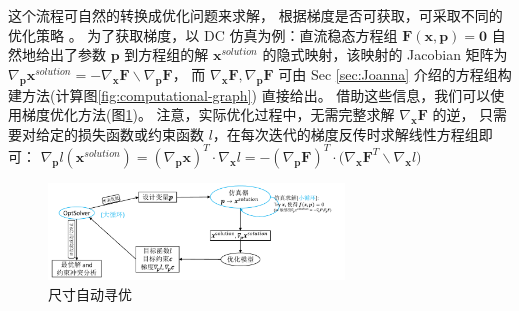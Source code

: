 这个流程可自然的转换成优化问题来求解，
根据梯度是否可获取，可采取不同的优化策略
\cite{zhan2004optimization,agrawal2006circuit,huang2013efficient,
nieuwoudt2005multi,peng2016efficient,girardi2011analog,lyu2018batch,
wang2014enabling,lyu2017efficient,tang2018parametric}。
为了获取梯度，以 DC 仿真为例：直流稳态方程组
$\bm{F}(\bm{x},\bm{p})=\bm{0}$ 自然地给出了参数 $\bm{p}$
到方程组的解 $\bm{x}^{solution}$ 的隐式映射，该映射的 Jacobian 矩阵为
$\nabla_{\bm{p}}\bm{x}^{solution}=-\nabla_{\bm{x}}\bm{F}\backslash\nabla_{\bm{p}}\bm{F}$，
而 $\nabla_{\bm{x}}\bm{F},\nabla_{\bm{p}}\bm{F}$ 可由 Sec \ref{sec:Joanna}
介绍的方程组构建方法(计算图\ref{fig:computational-graph}) 直接给出。
借助这些信息，我们可以使用梯度优化方法(图\ref{fig:solve-then-optimize})。
注意，实际优化过程中，无需完整求解 $\nabla_{\bm{x}}\bm{F}$ 的逆，
只需要对给定的损失函数或约束函数 $l$，在每次迭代的梯度反传时求解线性方程组即可：
$\nabla_{\bm{p}}l(\bm{x}^{solution})=(\nabla_{\bm{p}}\bm{x})^T\cdot\nabla_{\bm{x}}l
=-(\nabla_{\bm{p}}\bm{F})^T\cdot\big(\nabla_{\bm{x}}\bm{F}^T\backslash\nabla_{\bm{x}}l\big)$
\begin{figure}[htpb]
  \centering
    \includegraphics[width = 0.7\textwidth]{fig/solve-then-optimize.pdf}
  \caption{尺寸自动寻优}
  \label{fig:solve-then-optimize}
\end{figure}

